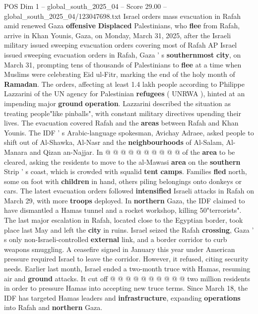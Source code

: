 \begin{textsample}{POS Dim 1 – global\_south\_2025\_04 – Score 29.00 – global\_south\_2025\_04/123047698.txt}  \label{ex:f1_pos_285}
Israel orders mass evacuation in Rafah amid renewed Gaza \textbf{offensive} \textbf{Displaced} Palestinians, who \textbf{flee} from Rafah, arrive in Khan Younis, Gaza, on Monday, March 31, 2025, after the Israeli military issued sweeping evacuation orders covering most of Rafah AP Israel issued sweeping evacuation orders in Rafah, Gaza ' s \textbf{southernmost} \textbf{city}, on March 31, prompting tens of thousands of Palestinians to \textbf{flee} at a time when Muslims were celebrating Eid ul-Fitr, marking the end of the holy month of \textbf{Ramadan}.
The orders, affecting at least 1.4 lakh people according to Philippe Lazzarini of the UN agency for Palestinian \textbf{refugees} ( UNRWA ), hinted at an impending major \textbf{ground} \textbf{operation}.
Lazzarini described the situation as treating people"like pinballs", with constant military directives upending their lives.
The evacuation covered Rafah and the \textbf{areas} between Rafah and Khan Younis.
The IDF ' s Arabic-language spokesman, Avichay Adraee, asked people to shift out of Al-Shawka, Al-Nasr and the \textbf{neighbourhoods} of Al-Salam, Al-Manara and Qizan an-Najjar.
In @ @ @ @ @ @ @ @ @ @ of the \textbf{area} to be cleared, asking the residents to move to the al-Mawasi \textbf{area} on the \textbf{southern} Strip ' s coast, which is crowded with squalid \textbf{tent} \textbf{camps}.
Families \textbf{fled} north, some on foot with \textbf{children} in hand, others piling belongings onto donkeys or cars.
The latest evacuation orders followed \textbf{intensified} Israeli attacks in Rafah on March 29, with more \textbf{troops} deployed.
In \textbf{northern} Gaza, the IDF claimed to have dismantled a Hamas tunnel and a rocket workshop, killing 50"terrorists".
The last major escalation in Rafah, located close to the Egyptian border, took place last May and left the \textbf{city} in ruins.
Israel seized the Rafah \textbf{crossing}, Gaza ' s only non-Israeli-controlled \textbf{external} link, and a border corridor to curb weapons smuggling.
A ceasefire signed in January this year under American pressure required Israel to leave the corridor.
However, it refused, citing security needs.
Earlier last month, Israel ended a two-month truce with Hamas, resuming air and \textbf{ground} attacks.
It cut off @ @ @ @ @ @ @ @ @ @ two million residents in order to pressure Hamas into accepting new truce terms.
Since March 18, the IDF has targeted Hamas leaders and \textbf{infrastructure}, expanding \textbf{operations} into Rafah and \textbf{northern} Gaza.

\end{textsample}
